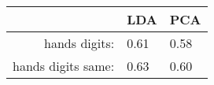 \begin{tabular}{|r|l|l|}
  \hline
    & LDA & PCA \\
  \hline
  hands digits: & 0.61 & 0.58 \\
  \hline
  hands digits same: & 0.63 & 0.60 \\
  \hline
\end{tabular}
